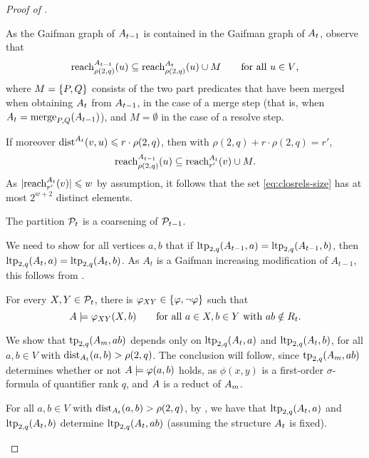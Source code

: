 \begin{proof}[Proof of ]
\begin{claimproof}
As the Gaifman graph of $\str A_{t-1}$ is contained in the Gaifman graph of $\str A_t$,
observe that
$$\reach^{\str A_{t-1}}_{\rho(2,q)}(u)\subset \reach^{\str A_{t}}_{\rho(2,q)}(u)\cup M\qquad\text{for all $u\in V$,}
$$
where $M=\set{P,Q}$ consists of the two part predicates that have been merged when obtaining $\str A_t$ from $\str A_{t-1}$, 
in the case of a merge step (that is, when $\str A_t=\merge PQ(\str A_{t-1})$), and $M=\emptyset$ in the case of a resolve step.

If moreover $\dist^{A_t}(v,u)\le r \cdot \rho(2,q)$, then with \(\rho(2,q) + r \cdot \rho(2,q) = r'\),
$$\reach^{\str A_{t-1}}_{\rho(2,q)}(u)\subset \reach^{\str A_{t}}_{r'}(v)\cup M.
$$
As $|\reach^{\str A_t}_{r'}(v)|\le w$ by assumption, 
it follows that the set \eqref{eq:closrels-size} has at most $2^{w+2}$ distinct elements.
\end{claimproof}


\begin{claim}\label{cl:coarse}
  The partition
  $\cal P_{t}$ is a coarsening of $\cal P_{t-1}$.
\end{claim}
\begin{claimproof}
  We need to show for all vertices \(a,b\) that if $\ltp_{2,q}(\str A_{t-1},a)=\ltp_{2,q}(\str A_{t-1},b)$,
  then $\ltp_{2,q}(\str A_{t},a)=\ltp_{2,q}(\str A_{t},b)$.
  As \(A_t\) is a Gaifman increasing modification of \(A_{t-1}\), this follows from .
\end{claimproof}


\begin{claim}\label{cl:default}
  For every $X,Y\in \cal P_t$,
  there is $\phi_{XY}\in\set{\phi,\neg\phi}$ such that 
  $$\str A\models\phi_{XY}(X,b)\text{\qquad for all 
  $a\in X,b\in Y$ with $ab\notin R_t$}.$$
\end{claim}
  \begin{claimproof}
    We show that $\tp_{2,q}(\str A_m,ab)$ depends only on 
    $\ltp_{2,q}(\str A_t,a)$ and $\ltp_{2,q}(\str A_t,b)$,
    for all $a,b\in V$ with $\dist_{\str A_t}(a,b) > \rho(2,q)$.
The conclusion will follow, 
    since $\tp_{2,q}(\str A_m,ab)$ determines whether or not $\str A\models\phi(a,b)$ holds, 
    as $\phi(x,y)$ is a first-order $\sigma$-formula of quantifier rank $q$,
    and $\str A$ is a reduct of $\str A_m$.


For all $a,b\in V$ with $\dist_{\str A_t}(a,b) > \rho(2,q)$, by ,
we have that 
$\ltp_{2,q}(\str A_t,a)$ and $\ltp_{2,q}(\str A_t,b)$
determine $\ltp_{2,q}(\str A_t,ab)$ (assuming the structure $\str A_t$ is fixed). 
    

\end{claimproof}
\end{proof}
